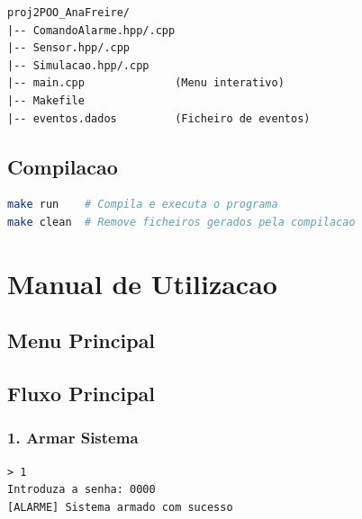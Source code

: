 \documentclass[12pt,a4paper]{article}
\begin{document}
\begin{lstlisting}
proj2POO_AnaFreire/
|-- ComandoAlarme.hpp/.cpp
|-- Sensor.hpp/.cpp
|-- Simulacao.hpp/.cpp
|-- main.cpp              (Menu interativo)
|-- Makefile
|-- eventos.dados         (Ficheiro de eventos)
\end{lstlisting}

\subsection{Compilacao}

\begin{lstlisting}[language=bash]
make run    # Compila e executa o programa
make clean  # Remove ficheiros gerados pela compilacao
\end{lstlisting}

\newpage

\section{Manual de Utilizacao}

\subsection{Menu Principal}

\begin{center}
\end{center}

\subsection{Fluxo Principal}

\subsubsection*{1. Armar Sistema}

\begin{verbatim}
> 1
Introduza a senha: 0000
[ALARME] Sistema armado com sucesso
\end{verbatim}
\end{document}
